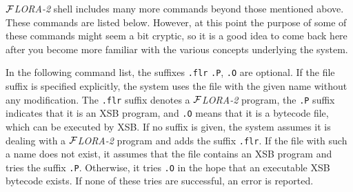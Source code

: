 \documentclass[11pt]{article}
\newcommand{\FLORA}{{\mbox{${\cal F}${\small\it LORA}\rm\emph{-2}}}\xspace}
\begin{document}
\FLORA shell includes many more commands beyond those mentioned above.
These commands are listed below. However, at this point the purpose of some
of these commands might seem a bit cryptic, so it is a good idea to come
back here after you become more familiar with the various concepts
underlying the system.

In the following command list, the suffixes {\tt .flr} {\tt .P}, {\tt .O}
are optional. If the file suffix is specified explicitly, the system uses
the file with the given name without any modification. The {\tt .flr}
suffix denotes a \FLORA program, the {\tt .P} suffix indicates that it is an
XSB program, and {\tt .O} means that it is a bytecode file, which can be
executed by XSB.  If no suffix is given, the system assumes it is dealing
with a \FLORA program and adds the suffix {\tt .flr}. If the file with such a
name does not exist, it assumes that the file contains an XSB program and
tries the suffix {\tt .P}. Otherwise, it tries {\tt .O} in the hope that an
executable XSB bytecode exists. If none of these tries are successful, an
error is reported.
%
\end{document}

